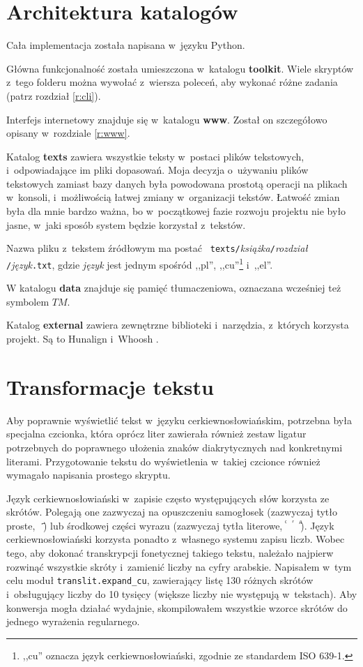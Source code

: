 \documentclass{pracamgr}
\begin{document}
\section{Architektura katalogów}

Cała implementacja została napisana w~języku Python.

Główna funkcjonalność została umieszczona w~katalogu
\textbf{toolkit}. Wiele skryptów z~tego folderu można wywołać z~wiersza
poleceń, aby wykonać różne zadania (patrz rozdział \ref{r:cli}).

Interfejs internetowy znajduje się w~katalogu \textbf{www}. Został on
szczegółowo opisany w~rozdziale \ref{r:www}.

Katalog \textbf{texts} zawiera wszystkie teksty w~postaci plików
tekstowych, i~odpowiadające im pliki dopasowań. Moja decyzja
o~używaniu plików tekstowych zamiast bazy danych była powodowana
prostotą operacji na plikach w~konsoli, i~możliwością łatwej zmiany
w~organizacji tekstów. Łatwość zmian była dla mnie bardzo ważna, bo
w~początkowej fazie rozwoju projektu nie było jasne, w~jaki sposób
system będzie korzystał z~tekstów.

Nazwa pliku z~tekstem źródłowym ma postać {\tt
  texts/}\textit{książka}{\tt /}\textit{rozdział}{\tt
  /}\textit{język}{\tt .txt}, gdzie \textit{język} jest jednym
spośród ,,pl'', ,,cu''\footnote{,,cu'' oznacza język
  cerkiewnosłowiański, zgodnie ze standardem ISO 639-1.}  i~,,el''.

W katalogu \textbf{data} znajduje się pamięć tłumaczeniowa, oznaczana
wcześniej też symbolem $TM$.

Katalog \textbf{external} zawiera zewnętrzne biblioteki i~narzędzia,
z~których korzysta projekt. Są to Hunalign \cite{hunalign} i~Whoosh
\cite{whoosh}.



\section{Transformacje tekstu}

Aby poprawnie wyświetlić tekst w~języku cerkiewno\-{}słowiańskim,
potrzebna była specjalna czcionka, która oprócz liter zawierała
również zestaw ligatur potrzebnych do poprawnego ułożenia znaków
diakrytycznych nad konkretnymi literami. Przygotowanie tekstu do
wyświetlenia w~takiej czcionce również wymagało napisania prostego
skryptu.

Język cerkiewno\-{}słowiański w~zapisie często występujących słów korzysta
ze skrótów. Polegają one zazwyczaj na opuszczeniu samogłosek
(zazwyczaj tytło proste, {\cyr\ ҃}) lub środkowej części wyrazu
(zazwyczaj tytła literowe, {\cyr ⷭ\ \ ⷢ\ \ ⷣ}). Język
cerkiewno\-{}słowiański korzysta ponadto z~własnego systemu zapisu
liczb. Wobec tego, aby dokonać transkrypcji fonetycznej takiego
tekstu, należało najpierw rozwinąć wszystkie skróty i~zamienić liczby
na cyfry arabskie. Napisałem w~tym celu moduł {\tt translit.expand\_cu},
zawierający listę 130 różnych skrótów i~obsługujący liczby do 10
tysięcy (większe liczby nie występują w~tekstach). Aby konwersja mogła
działać wydajnie, skompilowałem wszystkie wzorce skrótów do jednego
wyrażenia regularnego.
\end{document}

